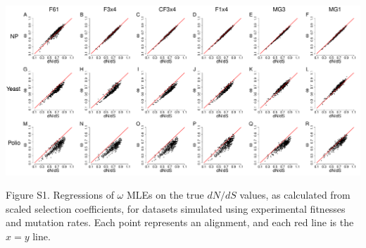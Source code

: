 \documentclass{pnastwo}
\begin{document}
\newpage

\begin{landscape}
	\includegraphics[width=9.5in]{figures/SI/nyp_regression.pdf}
	\vspace{0.5cm}
	
	Figure S1. Regressions of $\omega$ MLEs on the true $dN/dS$ values, as calculated from scaled selection coefficients, for datasets simulated using experimental fitnesses and mutation rates. Each point represents an alignment, and each red line is the $x=y$ line.
\end{landscape}
\end{document}
